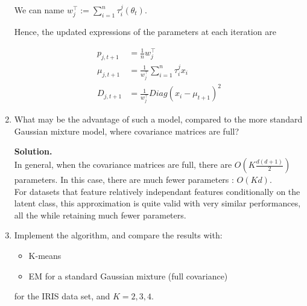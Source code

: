 \documentclass[a4paper, 11pt]{article}
\begin{document}
\begin{enumerate}
    We can name $w_j^\top  := \sum_{i=1}^{n} \tau_i^j(\theta_t)$.
    
    
    Hence, the updated expressions of the parameters at each iteration are 

    \begin{equation*}
        \boxed{\begin{aligned}
        p_{j,t+1} &= \frac{1}{n} w_j^\top  \\
        \mu_{j,t+1} &= \frac{1}{w_j^\top } \sum_{i=1}^{n} \tau_i^j x_i \\
        D_{j,t+1} &= \frac{1}{w_j^\top } Diag(x_i - \mu_{t+1})^{2}
        \end{aligned}}
    \end{equation*}
    
        
    \item What may be the advantage of such a model, compared to the more standard Gaussian mixture model, where covariance matrices are full? 
    
        \textbf{Solution.}\\
        In general, when the covariance matrices are full, there are $O \left( K\frac{d(d+1)}{2} \right)$ parameters. In this case, there are much fewer parameters : $O \left(Kd\right)$. \\
        For datasets that feature relatively independant features conditionally on the latent class, this approximation is quite valid with very similar performances, all the while retaining much fewer parameters.
        
    \item Implement the algorithm, and compare the results with: 
            \begin{itemize}
                \item K-means
                \item EM for a standard Gaussian mixture (full covariance)
            \end{itemize}
    for the IRIS data set, and $K = 2, 3, 4$. 
    

\end{enumerate}
\end{document}
